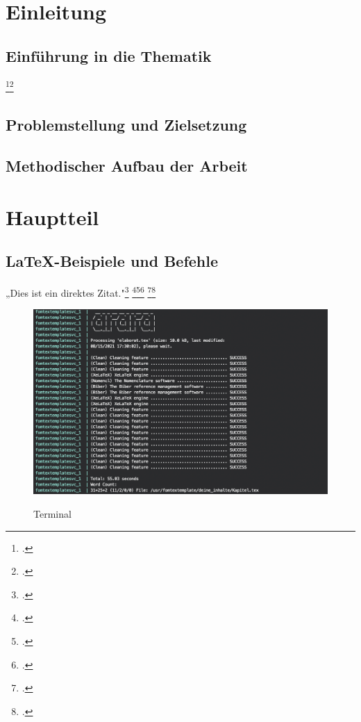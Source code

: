 \section{Einleitung}
\subsection{Einführung in die Thematik}
\blindtext{}
\blindtext\footcite[Vgl. ][]{mswpf}\footcite[Vgl. ][19]{sadtler_rechtskonformes_2017}

\subsection{Problemstellung und Zielsetzung}
\blindtext

\subsection{Methodischer Aufbau der Arbeit}
\blindtext

\section{Hauptteil}
\subsection{LaTeX-Beispiele und Befehle}
„Dies ist ein direktes Zitat."\footcite[][224]{mertens_digitalisierung_2017} \blindtext\footcite[Vgl. ][]{msdatabind}\footcite[Vgl. ][]{lambda}\footcite[Vgl. ][34]{Digitaloekonomie}
\blindenumerate
\blindtext\footcite[Vgl. ][415-426]{Tanenbaum2016}\footcite[Vgl. ][223]{mandl_internet_2019}

\begin{figure}[!htb]
    \caption{Terminal}
    \includegraphics[width=1\textwidth]{.github/terminal}
    \captionsetup{width=1\textwidth}
    \label{abb_bsp}
\end{figure}
\blindtext

